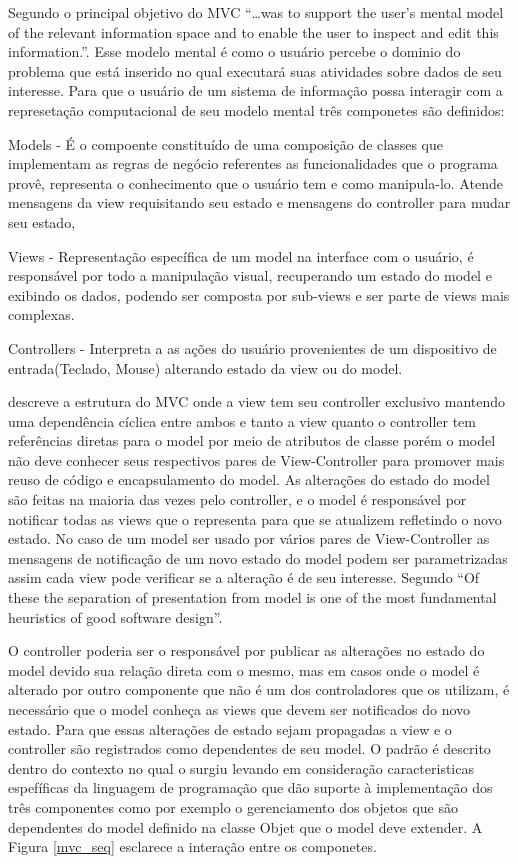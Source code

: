 Segundo  o principal objetivo do MVC ``\ldots was to
support the user's mental model of the relevant information space and to enable
the user to inspect and edit this information.''. Esse modelo mental é como o
usuário percebe o dominio do problema que está inserido no qual executará suas
atividades sobre dados de seu interesse. Para que o usuário de um sistema de
informação possa interagir com a represetação computacional  de seu modelo
mental três componetes são definidos:

Models - É o compoente constituído de uma composição de classes que implementam
as regras de negócio referentes as funcionalidades que o programa provê,
representa o  conhecimento que o usuário tem e como manipula-lo. Atende
mensagens da view requisitando seu estado e mensagens do controller para mudar
seu estado,

Views - Representação específica de um model na interface com o usuário, é 
responsável por todo a manipulação visual, recuperando um estado do model e
exibindo os dados, podendo ser composta por sub-views e ser parte de views mais
complexas.

Controllers - Interpreta a as ações do usuário provenientes de um dispositivo de
entrada(Teclado, Mouse) alterando estado da view ou do model.




 descreve a estrutura do MVC onde a view tem seu
controller exclusivo mantendo uma dependência cíclica entre ambos e tanto a view
quanto o controller tem referências diretas para o model por meio de atributos
de classe porém o model não deve conhecer seus respectivos pares de
View-Controller para promover mais reuso de código e encapsulamento do model. As
alterações do estado do model são feitas na maioria das vezes pelo controller, e
o model é responsável por notificar todas as views que o representa para que
se atualizem refletindo o novo estado. No caso de um model ser usado por vários
pares de View-Controller as mensagens de notificação de um novo estado do model
podem ser parametrizadas assim cada view pode verificar se a alteração é de seu
interesse. Segundo  ``Of these the separation of presentation
from model is one of the most fundamental heuristics of good software design''.

O controller poderia ser o responsável por publicar as alterações no estado do
model devido sua relação direta com o mesmo, mas em casos onde o model é
alterado por outro componente que não é um dos controladores que os utilizam, é
necessário que o model conheça as views que devem ser notificados do novo
estado. Para que essas alterações de estado sejam propagadas a view e o
controller são registrados como dependentes de seu model. O padrão é descrito
dentro do contexto no qual o surgiu levando em consideração caracteristicas
espefíficas da  linguagem de programação que dão suporte à implementação dos
três componentes como por exemplo o gerenciamento dos objetos que são
dependentes do model definido na classe Objet que o model deve extender. A
Figura \ref{mvc_seq} esclarece a interação entre os componetes.

